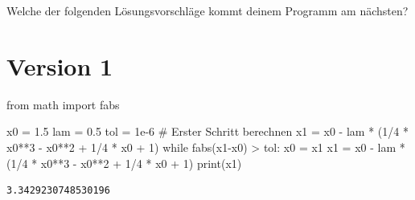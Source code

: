 \documentclass[
  a4paper,
  DIV=11]{scrreprt}
\newenvironment{Shaded}{\begin{snugshade}}{\end{snugshade}}
\newcommand{\BuiltInTok}[1]{\textcolor[rgb]{0.00,0.23,0.31}{#1}}
\newcommand{\CommentTok}[1]{\textcolor[rgb]{0.37,0.37,0.37}{#1}}
\newcommand{\ControlFlowTok}[1]{\textcolor[rgb]{0.00,0.23,0.31}{#1}}
\newcommand{\DecValTok}[1]{\textcolor[rgb]{0.68,0.00,0.00}{#1}}
\newcommand{\FloatTok}[1]{\textcolor[rgb]{0.68,0.00,0.00}{#1}}
\newcommand{\ImportTok}[1]{\textcolor[rgb]{0.00,0.46,0.62}{#1}}
\newcommand{\NormalTok}[1]{\textcolor[rgb]{0.00,0.23,0.31}{#1}}
\newcommand{\OperatorTok}[1]{\textcolor[rgb]{0.37,0.37,0.37}{#1}}
\theoremstyle{definition}
\theoremstyle{definition}
\theoremstyle{remark}
\begin{document}
\begin{tcolorbox}[enhanced jigsaw, titlerule=0mm, title=\textcolor{quarto-callout-tip-color}{\faLightbulb}\hspace{0.5em}{Lösung}, breakable, coltitle=black, leftrule=.75mm, bottomrule=.15mm, colback=white, rightrule=.15mm, opacitybacktitle=0.6, bottomtitle=1mm, toptitle=1mm, left=2mm, toprule=.15mm, colbacktitle=quarto-callout-tip-color!10!white, colframe=quarto-callout-tip-color-frame, arc=.35mm, opacityback=0]

Welche der folgenden Lösungsvorschläge kommt deinem Programm am
nächsten?

\section{Version 1}

\begin{Shaded}
\begin{Highlighting}[]
\ImportTok{from}\NormalTok{ math }\ImportTok{import}\NormalTok{ fabs}

\NormalTok{x0 }\OperatorTok{=} \FloatTok{1.5}
\NormalTok{lam }\OperatorTok{=} \FloatTok{0.5}
\NormalTok{tol }\OperatorTok{=} \FloatTok{1e{-}6}
\CommentTok{\# Erster Schritt berechnen}
\NormalTok{x1 }\OperatorTok{=}\NormalTok{ x0 }\OperatorTok{{-}}\NormalTok{ lam }\OperatorTok{*}\NormalTok{ (}\DecValTok{1}\OperatorTok{/}\DecValTok{4} \OperatorTok{*}\NormalTok{ x0}\OperatorTok{**}\DecValTok{3} \OperatorTok{{-}}\NormalTok{ x0}\OperatorTok{**}\DecValTok{2} \OperatorTok{+} \DecValTok{1}\OperatorTok{/}\DecValTok{4} \OperatorTok{*}\NormalTok{ x0 }\OperatorTok{+} \DecValTok{1}\NormalTok{)}
\ControlFlowTok{while}\NormalTok{ fabs(x1}\OperatorTok{{-}}\NormalTok{x0) }\OperatorTok{\textgreater{}}\NormalTok{ tol:}
\NormalTok{    x0 }\OperatorTok{=}\NormalTok{ x1}
\NormalTok{    x1 }\OperatorTok{=}\NormalTok{ x0 }\OperatorTok{{-}}\NormalTok{ lam }\OperatorTok{*}\NormalTok{ (}\DecValTok{1}\OperatorTok{/}\DecValTok{4} \OperatorTok{*}\NormalTok{ x0}\OperatorTok{**}\DecValTok{3} \OperatorTok{{-}}\NormalTok{ x0}\OperatorTok{**}\DecValTok{2} \OperatorTok{+} \DecValTok{1}\OperatorTok{/}\DecValTok{4} \OperatorTok{*}\NormalTok{ x0 }\OperatorTok{+} \DecValTok{1}\NormalTok{)}
\BuiltInTok{print}\NormalTok{(x1)}
\end{Highlighting}
\end{Shaded}

\begin{verbatim}
3.3429230748530196
\end{verbatim}


\end{tcolorbox}
\end{document}
